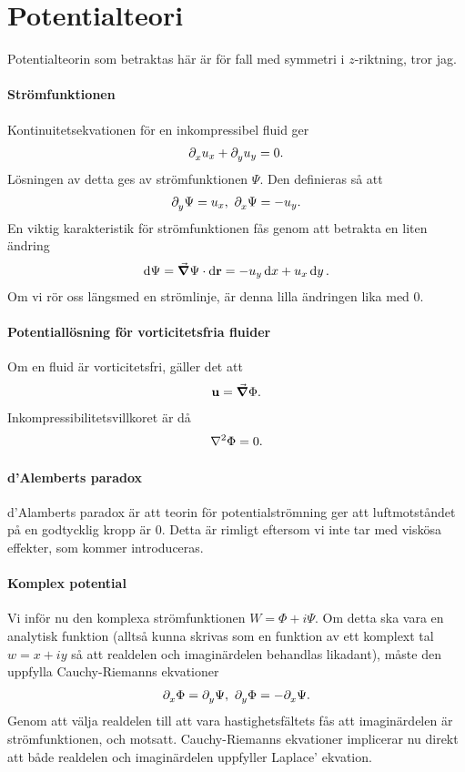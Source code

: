 \section{Potentialteori}
Potentialteorin som betraktas här är för fall med symmetri i $z$-riktning, tror jag.

\paragraph{Strömfunktionen}
Kontinuitetsekvationen för en inkompressibel fluid ger
\begin{align*}
	\partial_{x}^{}u_{x} + \partial_{y}^{}u_{y} = 0.
\end{align*}
Lösningen av detta ges av strömfunktionen $\Psi$. Den definieras så att
\begin{align*}
	\partial_{y}^{}\Psi = u_{x},\ \partial_{x}^{}\Psi = -u_{y}.
\end{align*}
En viktig karakteristik för strömfunktionen fås genom att betrakta en liten ändring
\begin{align*}
	\dd{\Psi} = \grad{\Psi}\cdot\dd{\vb{r}} = -u_{y}\dd{x} + u_{x}\dd{y}.
\end{align*}
Om vi rör oss längsmed en strömlinje, är denna lilla ändringen lika med $0$.

\paragraph{Potentiallösning för vorticitetsfria fluider}
Om en fluid är vorticitetsfri, gäller det att
\begin{align*}
	\vb{u} = \grad{\Phi}.
\end{align*}
Inkompressibilitetsvillkoret är då
\begin{align*}
	\laplacian{\Phi} = 0.
\end{align*}

\paragraph{d'Alemberts paradox}
d'Alamberts paradox är att teorin för potentialströmning ger att luftmotståndet på en godtycklig kropp är $0$. Detta är rimligt eftersom vi inte tar med viskösa effekter, som kommer introduceras.

\paragraph{Komplex potential}
Vi inför nu den komplexa strömfunktionen $W = \Phi + i\Psi$. Om detta ska vara en analytisk funktion (alltså kunna skrivas som en funktion av ett komplext tal $w = x + iy$ så att realdelen och imaginärdelen behandlas likadant), måste den uppfylla Cauchy-Riemanns ekvationer
\begin{align*}
	\partial_{x}^{}\Phi = \partial_{y}^{}\Psi,\ \partial_{y}^{}\Phi = -\partial_{x}^{}\Psi.
\end{align*}
Genom att välja realdelen till att vara hastighetsfältets fås att imaginärdelen är strömfunktionen, och motsatt. Cauchy-Riemanns ekvationer implicerar nu direkt att både realdelen och imaginärdelen uppfyller Laplace' ekvation.

